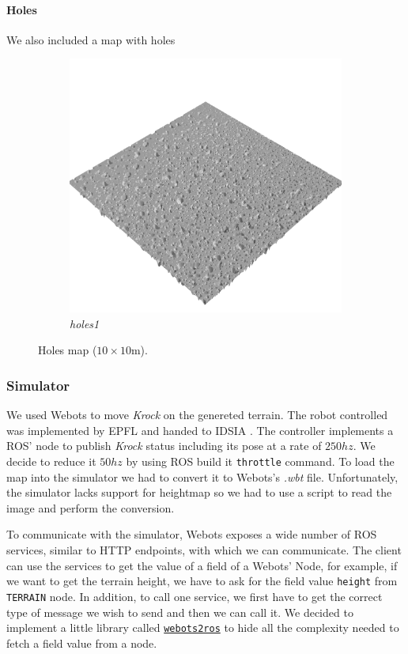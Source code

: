 \documentclass[../document.tex]{subfiles}
\begin{document}
\paragraph{Holes} We also included a map with holes
\begin{figure}[H]
    \centering
        \begin{subfigure}[b]{0.32\textwidth}
            \includegraphics[width=\textwidth]{../img/hm3d/holes1.png}
            \caption{\emph{holes1}}
        \end{subfigure}
\caption{Holes map ($10\times10$m).}
\end{figure}
\subsubsection{Simulator}
We used Webots to move \emph{Krock} on the genereted terrain. The robot controlled was implemented by EPFL  and handed to IDSIA . The controller implements a ROS' node to publish \emph{Krock} status including its pose at a rate of $250hz$. We decide to reduce it $50hz$ by using ROS build it \texttt{throttle} command. 
To load the map into the simulator we had to convert it to Webots's \emph{.wbt} file. Unfortunately, the simulator lacks support for heightmap so we had to use a script to read the image and perform the conversion.

To communicate with the simulator, Webots exposes a wide number of ROS services, similar to HTTP endpoints, with which we can communicate. The client can use the services to get the value of a field of a Webots' Node, for example, if we want to get the terrain height, we have to ask for the field value \texttt{height} from \texttt{TERRAIN} node. In addition, to call one service, we first have to get the correct type of message we wish to send and then we can call it. We decided to implement a little library called \href{https://github.com/FrancescoSaverioZuppichini/Master-Thesis/tree/master/core/utilities/webots2ros}{\texttt{webots2ros}} to hide all the complexity needed to fetch a field value from a node.
\end{document}
